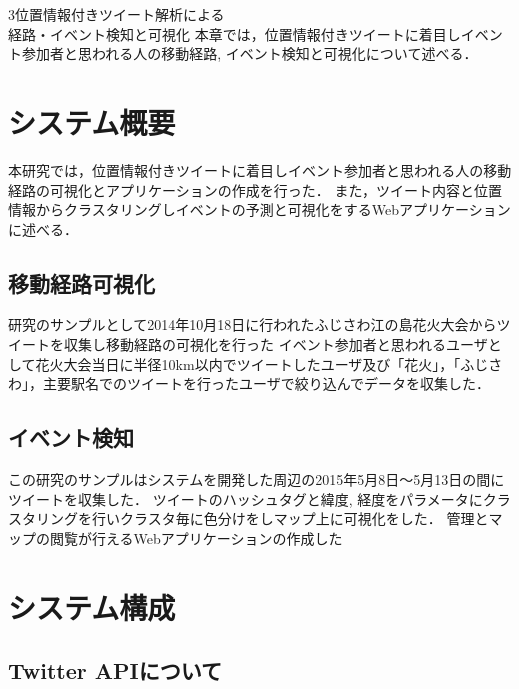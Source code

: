 \chapterhead
{3}{位置情報付きツイート解析による\\
経路・イベント検知と可視化}
{本章では，位置情報付きツイートに着目しイベント参加者と思われる人の移動経路, イベント検知と可視化について述べる．}


\section{システム概要}
本研究では，位置情報付きツイートに着目しイベント参加者と思われる人の移動経路の可視化とアプリケーションの作成を行った．
また，ツイート内容と位置情報からクラスタリングしイベントの予測と可視化をするWebアプリケーションに述べる．

\subsection{移動経路可視化}
研究のサンプルとして2014年10月18日に行われたふじさわ江の島花火大会\cite{webpagefujisawa}からツイートを収集し移動経路の可視化を行った
イベント参加者と思われるユーザとして花火大会当日に半径10km以内でツイートしたユーザ及び「花火」，「ふじさわ」，主要駅名でのツイートを行ったユーザで絞り込んでデータを収集した．


\subsection{イベント検知}
この研究のサンプルはシステムを開発した周辺の2015年5月8日〜5月13日の間にツイートを収集した．
ツイートのハッシュタグと緯度, 経度をパラメータにクラスタリングを行いクラスタ毎に色分けをしマップ上に可視化をした．
管理とマップの閲覧が行えるWebアプリケーションの作成した



\newpage

\section{システム構成}
\subsection{Twitter APIについて}
